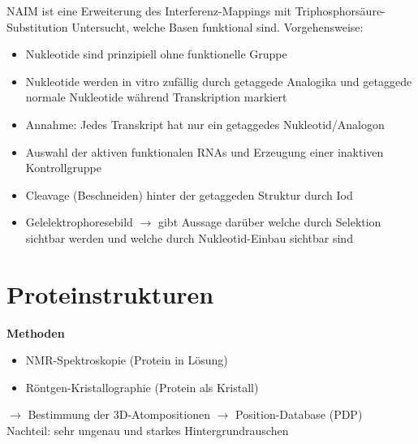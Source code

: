 NAIM ist eine Erweiterung des Interferenz-Mappings mit Triphosphorsäure-Substitution
Untersucht, welche Basen funktional sind. Vorgehensweise:
\begin{itemize}
\item Nukleotide sind prinzipiell ohne funktionelle Gruppe
\item Nukleotide werden in vitro zufällig durch getaggede Analogika und getaggede normale Nukleotide während Transkription markiert
\item Annahme: Jedes Transkript hat nur ein getaggedes Nukleotid/Analogon
\item Auswahl der aktiven funktionalen RNAs und Erzeugung einer inaktiven Kontrollgruppe
\item Cleavage (Beschneiden) hinter der getaggeden Struktur durch Iod
\item Gelelektrophoresebild $\rightarrow$ gibt Aussage darüber welche durch Selektion sichtbar werden und welche durch Nukleotid-Einbau sichtbar sind
\end{itemize}

\section{Proteinstrukturen}
\textbf{Methoden}
\begin{itemize}
\item NMR-Spektroskopie (Protein in Lösung)
\item Röntgen-Kristallographie (Protein als Kristall)
\end{itemize}
$\rightarrow$ Bestimmung der 3D-Atompositionen $\rightarrow$ Position-Database (PDP)\\

Nachteil: sehr ungenau und starkes Hintergrundrauschen